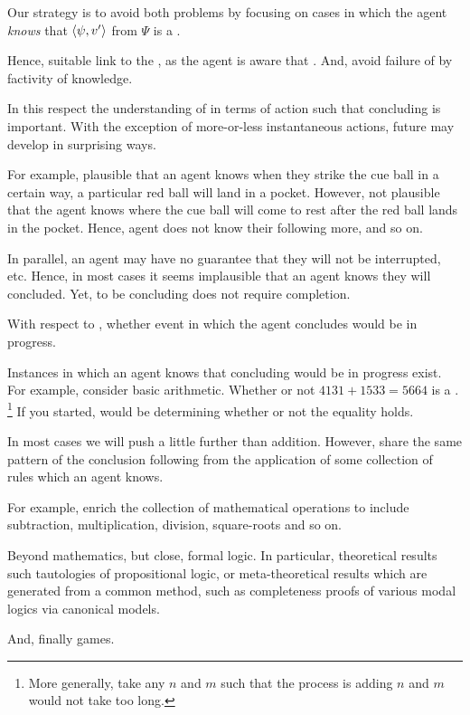 \begin{note}
  Our strategy is to avoid both problems by focusing on cases in which the agent \emph{knows} that \(\langle \psi, v' \rangle\) from \(\Psi\) is a \fc{}.

  Hence, suitable link to the \agpe{}, as the agent is aware that \fc{}.
  And, avoid failure of \fc{} by factivity of knowledge.

  In this respect the understanding of  in terms of action such that concluding is important.
  With the exception of more-or-less instantaneous actions, future may develop in surprising ways.

  For example, plausible that an agent knows when they strike the cue ball in a certain way, a particular red ball will land in a pocket.
  However, not plausible that the agent knows where the cue ball will come to rest after the red ball lands in the pocket.
  Hence, agent does not know their following more, and so on.

  In parallel, an agent may have no guarantee that they will not be interrupted, etc.
  Hence, in most cases it seems implausible that an agent knows they will concluded.
  Yet, to be concluding does not require completion.

  With respect to \fc{}, whether event in which the agent concludes would be in progress.

  Instances in which an agent knows that concluding would be in progress exist.
  For example, consider basic arithmetic.
  Whether or not \(4131 + 1533 = 5664\) is a \fc{}.%
  \footnote{
    More generally, take any \(n\) and \(m\) such that the process is adding \(n\) and \(m\) would not take too long.
  }
  If you started, would be determining whether or not the equality holds.

  In most cases we will push a little further than addition.
  However, share the same pattern of the conclusion following from the application of some collection of rules which an agent knows.

  For example, enrich the collection of mathematical operations to include subtraction, multiplication, division, square-roots and so on.

  Beyond mathematics, but close, formal logic.
  In particular, theoretical results such tautologies of propositional logic, or meta-theoretical results which are generated from a common method, such as completeness proofs of various modal logics via canonical models.

  And, finally games.


\end{note}
